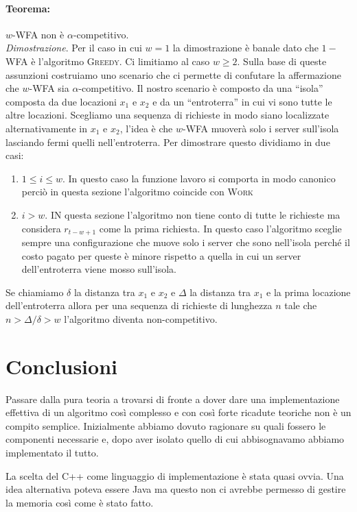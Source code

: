 \documentclass[a4paper, 10pt]{article}
\begin{document}
\paragraph{Teorema:} $w$-WFA non è $\alpha$-competitivo.\\
\emph{Dimostrazione}. Per il caso in cui $w = 1$ la dimostrazione è banale dato
che $1-$WFA è l'algoritmo \textsc{Greedy}. Ci limitiamo al caso $w \geq 2$.
Sulla base di queste assunzioni costruiamo uno scenario che ci permette di 
confutare la affermazione che $w$-WFA sia $\alpha$-competitivo. Il nostro 
scenario è composto da una ``isola'' composta da due locazioni $x_1$ e $x_2$ e 
da un ``entroterra'' in cui vi sono tutte le altre locazioni. Scegliamo una 
sequenza di richieste in modo siano localizzate alternativamente in $x_1$ e 
$x_2$, l'idea è che $w$-WFA muoverà solo i server sull'isola lasciando fermi 
quelli nell'entroterra. Per dimostrare questo dividiamo in due casi:
\begin{enumerate}
    \item $1 \leq i \leq w$. In questo caso la funzione lavoro si comporta in 
    modo canonico perciò in questa sezione l'algoritmo coincide con 
    \textsc{Work} 
    \item $i > w$. IN questa sezione l'algoritmo non tiene conto di tutte le 
    richieste ma considera $r_{t - w + 1}$ come la prima richiesta. In questo 
    caso l'algoritmo sceglie sempre una configurazione che muove solo i server 
    che sono nell'isola perché il costo pagato per queste è minore rispetto a 
    quella in cui un server dell'entroterra viene mosso sull'isola. 
\end{enumerate}
Se chiamiamo $\delta$ la distanza tra $x_1$ e $x_2$ e $\Delta$ la distanza tra 
$x_1$ e la prima locazione dell'entroterra allora per una sequenza di richieste
di lunghezza $n$ tale che $n > \Delta / \delta > w$ l'algoritmo diventa 
non-competitivo.

\section{Conclusioni}
Passare dalla pura teoria a trovarsi di fronte a dover dare una implementazione 
effettiva di un algoritmo così complesso e con così forte ricadute teoriche 
non è un compito semplice. Inizialmente abbiamo dovuto ragionare su quali 
fossero le componenti necessarie e, dopo aver isolato quello di cui 
abbisognavamo abbiamo implementato il tutto. 

La scelta del C++ come linguaggio di implementazione è stata quasi ovvia. Una 
idea alternativa poteva essere Java ma questo non ci avrebbe permesso di 
gestire la memoria così come è stato fatto.  



\end{document}
